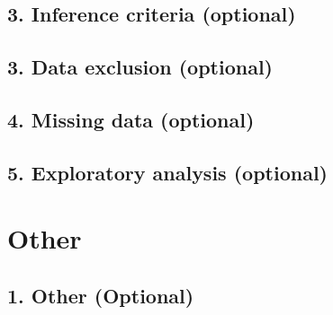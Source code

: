 \documentclass[A4,11pt]{article}
\renewcommand{\~}[1]{\tilde{#1}}
\renewcommand{\-}[1]{\overline{#1}}
\begin{document}
 
\subsection*{3. Inference criteria (optional)}



\subsection*{3. Data exclusion (optional)}


\subsection*{4. Missing data (optional)}

\subsection*{5. Exploratory analysis (optional)}

\newpage

\section*{ Other }

\subsection*{1. Other (Optional)}

\end{document}
